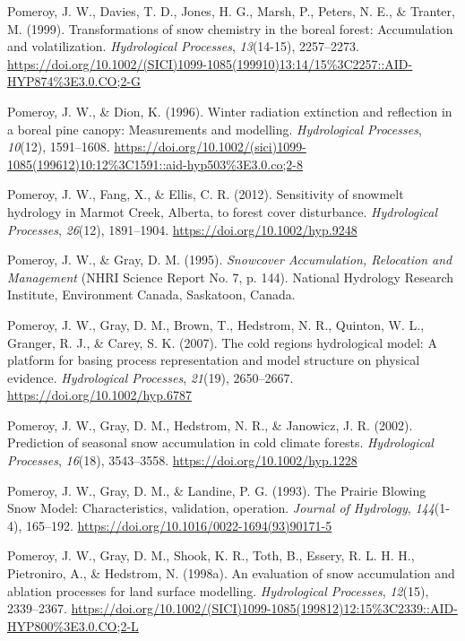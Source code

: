 \documentclass[
  letterpaper,
]{tex/uofsthesis-cs}
\newlength{\cslhangindent}
\newenvironment{CSLReferences}[2] %
 {\begin{list}{}{%
  \setlength{\itemindent}{0pt}
  \setlength{\leftmargin}{0pt}
  \setlength{\parsep}{0pt}
  \ifodd #1
   \setlength{\leftmargin}{\cslhangindent}
   \setlength{\itemindent}{-1\cslhangindent}
  \fi
  \setlength{\itemsep}{#2\baselineskip}}}
 {\end{list}}
\begin{document}
\begin{CSLReferences}{1}{0}
Pomeroy, J. W., Davies, T. D., Jones, H. G., Marsh, P., Peters, N. E.,
\& Tranter, M. (1999). Transformations of snow chemistry in the boreal
forest: Accumulation and volatilization. \emph{Hydrological Processes},
\emph{13}(14-15), 2257--2273.
\url{https://doi.org/10.1002/(SICI)1099-1085(199910)13:14/15\%3C2257::AID-HYP874\%3E3.0.CO;2-G}

Pomeroy, J. W., \& Dion, K. (1996). Winter radiation extinction and
reflection in a boreal pine canopy: {Measurements} and modelling.
\emph{Hydrological Processes}, \emph{10}(12), 1591--1608.
\url{https://doi.org/10.1002/(sici)1099-1085(199612)10:12\%3C1591::aid-hyp503\%3E3.0.co;2-8}

Pomeroy, J. W., Fang, X., \& Ellis, C. R. (2012). Sensitivity of
snowmelt hydrology in {Marmot Creek}, {Alberta}, to forest cover
disturbance. \emph{Hydrological Processes}, \emph{26}(12), 1891--1904.
\url{https://doi.org/10.1002/hyp.9248}

Pomeroy, J. W., \& Gray, D. M. (1995). \emph{Snowcover {Accumulation},
{Relocation} and {Management}} (NHRI Science Report No. 7, p. 144).
National Hydrology Research Institute, Environment Canada, Saskatoon,
Canada.

Pomeroy, J. W., Gray, D. M., Brown, T., Hedstrom, N. R., Quinton, W. L.,
Granger, R. J., \& Carey, S. K. (2007). The cold regions hydrological
model: A platform for basing process representation and model structure
on physical evidence. \emph{Hydrological Processes}, \emph{21}(19),
2650--2667. \url{https://doi.org/10.1002/hyp.6787}

Pomeroy, J. W., Gray, D. M., Hedstrom, N. R., \& Janowicz, J. R. (2002).
Prediction of seasonal snow accumulation in cold climate forests.
\emph{Hydrological Processes}, \emph{16}(18), 3543--3558.
\url{https://doi.org/10.1002/hyp.1228}

Pomeroy, J. W., Gray, D. M., \& Landine, P. G. (1993). The {Prairie
Blowing Snow Model}: Characteristics, validation, operation.
\emph{Journal of Hydrology}, \emph{144}(1-4), 165--192.
\url{https://doi.org/10.1016/0022-1694(93)90171-5}

Pomeroy, J. W., Gray, D. M., Shook, K. R., Toth, B., Essery, R. L. H.
H., Pietroniro, A., \& Hedstrom, N. (1998a). An evaluation of snow
accumulation and ablation processes for land surface modelling.
\emph{Hydrological Processes}, \emph{12}(15), 2339--2367.
\url{https://doi.org/10.1002/(SICI)1099-1085(199812)12:15\%3C2339::AID-HYP800\%3E3.0.CO;2-L}


\end{CSLReferences}
\end{document}
